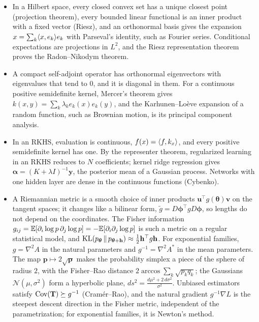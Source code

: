 \begin{itemize}[leftmargin=*]
    \item In a Hilbert space, every closed convex set has a unique closest point (projection theorem), every bounded linear functional is an inner product with a fixed vector (Riesz), and an orthonormal basis gives the expansion $x = \sum_k \langle x, e_k \rangle e_k$ with Parseval's identity, such as Fourier series. Conditional expectations are projections in $L^2$, and the Riesz representation theorem proves the Radon--Nikodym theorem.
    \item A compact self-adjoint operator has orthonormal eigenvectors with eigenvalues that tend to $0$, and it is diagonal in them. For a continuous positive semidefinite kernel, Mercer's theorem gives $k(x, y) = \sum_k \lambda_ke_k(x)e_k(y)$, and the Karhunen--Lo\`eve expansion of a random function, such as Brownian motion, is its principal component analysis.
    \item In an RKHS, evaluation is continuous, $f(x) = \langle f, k_x \rangle$, and every positive semidefinite kernel has one. By the representer theorem, regularized learning in an RKHS reduces to $N$ coefficients; kernel ridge regression gives $\boldsymbol{\alpha} = (K + \lambda I)^{-1}\mathbf{y}$, the posterior mean of a Gaussian process. Networks with one hidden layer are dense in the continuous functions (Cybenko).
    \item A Riemannian metric is a smooth choice of inner products $\mathbf{u}^\top g(\boldsymbol{\theta})\mathbf{v}$ on the tangent spaces; it changes like a bilinear form, $\tilde g = D\boldsymbol{\phi}^\top gD\boldsymbol{\phi}$, so lengths do not depend on the coordinates. The Fisher information $g_{ij} = \mathbb{E}[\partial_i\log p\,\partial_j\log p] = -\mathbb{E}[\partial_i\partial_j\log p]$ is such a metric on a regular statistical model, and $\operatorname{KL}(p_{\boldsymbol{\theta}} \,\|\, p_{\boldsymbol{\theta} + \mathbf{h}}) \approx \frac{1}{2}\mathbf{h}^\top g\mathbf{h}$. For exponential families, $g = \nabla^2A$ in the natural parameters and $g^{-1} = \nabla^2A^*$ in the mean parameters. The map $\mathbf{p} \mapsto 2\sqrt{\mathbf{p}}$ makes the probability simplex a piece of the sphere of radius $2$, with the Fisher--Rao distance $2\arccos\sum_k\sqrt{p_kq_k}$; the Gaussians $\mathcal{N}(\mu, \sigma^2)$ form a hyperbolic plane, $ds^2 = \frac{d\mu^2 + 2\,d\sigma^2}{\sigma^2}$. Unbiased estimators satisfy $\operatorname{Cov}(\mathbf{T}) \succeq g^{-1}$ (Cram\'er--Rao), and the natural gradient $g^{-1}\nabla L$ is the steepest descent direction in the Fisher metric, independent of the parametrization; for exponential families, it is Newton's method.
\end{itemize}

